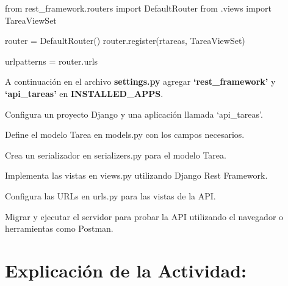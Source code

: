 \documentclass[
  a4paper,
  DIV=11,
  numbers=noendperiod,
  onepage,
  openany]{scrreprt}
\newenvironment{Shaded}{\begin{snugshade}}{\end{snugshade}}
\newcommand{\ImportTok}[1]{\textcolor[rgb]{0.00,0.46,0.62}{#1}}
\newcommand{\NormalTok}[1]{\textcolor[rgb]{0.00,0.23,0.31}{#1}}
\newcommand{\OperatorTok}[1]{\textcolor[rgb]{0.37,0.37,0.37}{#1}}
\newcommand{\VerbatimStringTok}[1]{\textcolor[rgb]{0.13,0.47,0.30}{#1}}
\begin{document}
\begin{Shaded}
\begin{Highlighting}[]
\ImportTok{from}\NormalTok{ rest\_framework.routers }\ImportTok{import}\NormalTok{ DefaultRouter}
\ImportTok{from}\NormalTok{ .views }\ImportTok{import}\NormalTok{ TareaViewSet}

\NormalTok{router }\OperatorTok{=}\NormalTok{ DefaultRouter()}
\NormalTok{router.register(}\VerbatimStringTok{r\textquotesingle{}tareas\textquotesingle{}}\NormalTok{, TareaViewSet)}

\NormalTok{urlpatterns }\OperatorTok{=}\NormalTok{ router.urls}
\end{Highlighting}
\end{Shaded}

A continuación en el archivo \textbf{settings.py} agregar
\textbf{`rest\_framework'} y \textbf{`api\_tareas'} en
\textbf{INSTALLED\_APPS}.

\begin{tcolorbox}[enhanced jigsaw, colbacktitle=quarto-callout-important-color!10!white, toprule=.15mm, leftrule=.75mm, titlerule=0mm, opacityback=0, rightrule=.15mm, opacitybacktitle=0.6, breakable, left=2mm, coltitle=black, title=\textcolor{quarto-callout-important-color}{\faExclamation}\hspace{0.5em}{Actividad Práctica:}, toptitle=1mm, bottomtitle=1mm, arc=.35mm, bottomrule=.15mm, colback=white, colframe=quarto-callout-important-color-frame]

Configura un proyecto Django y una aplicación llamada `api\_tareas'.

Define el modelo Tarea en models.py con los campos necesarios.

Crea un serializador en serializers.py para el modelo Tarea.

Implementa las vistas en views.py utilizando Django Rest Framework.

Configura las URLs en urls.py para las vistas de la API.

Migrar y ejecutar el servidor para probar la API utilizando el navegador
o herramientas como Postman.

\end{tcolorbox}

\hypertarget{explicaciuxf3n-de-la-actividad-85}{%
\section{Explicación de la
Actividad:}\label{explicaciuxf3n-de-la-actividad-85}}
\end{document}
